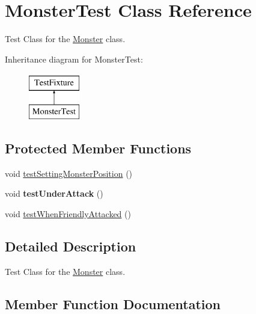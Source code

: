 \hypertarget{class_monster_test}{}\section{Monster\+Test Class Reference}
\label{class_monster_test}


Test Class for the \hyperlink{class_monster}{Monster} class.  


Inheritance diagram for Monster\+Test\+:\begin{figure}[H]
\begin{center}
\leavevmode
\includegraphics[height=2.000000cm]{class_monster_test}
\end{center}
\end{figure}
\subsection*{Protected Member Functions}
\begin{DoxyCompactItemize}
\item 
void \hyperlink{class_monster_test_ad02b4f6d2f4b5283551b92ff9f4866eb}{test\+Setting\+Monster\+Position} ()
\item 
\hypertarget{class_monster_test_af7b91e36a38e65c8ba14e90fe17f7906}{}\label{class_monster_test_af7b91e36a38e65c8ba14e90fe17f7906} 
void {\bfseries test\+Under\+Attack} ()
\item 
void \hyperlink{class_monster_test_a311fafa951a5c78813e7f98a1144c30d}{test\+When\+Friendly\+Attacked} ()
\end{DoxyCompactItemize}


\subsection{Detailed Description}
Test Class for the \hyperlink{class_monster}{Monster} class. 

\subsection{Member Function Documentation}
\hypertarget{class_monster_test_ad02b4f6d2f4b5283551b92ff9f4866eb}{}\label{class_monster_test_ad02b4f6d2f4b5283551b92ff9f4866eb} 
